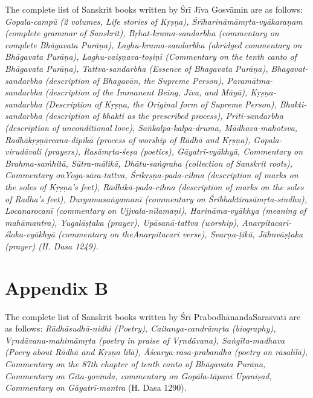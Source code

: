 The complete list of Sanskrit books written by Śrī Jīva Gosvāmin are as follows: {\sl  Gopala-campū {\rm (2 volumes, Life stories of Kṛṣṇa)}, Śrīharināmā\-mṛta-vyākaraṇam {\rm (complete grammar of Sanskrit)}, Bṛhat-krama-sanda\-rbha {\rm (commentary on complete {\sl Bhāgavata Purāṇa})}, Laghu-krama-\Break sandarbha {\rm (abridged commentary on {\sl Bhāgavata Purāṇa})}, Laghu-vai\-ṣṇa\-va-toṣiṇī {\rm (Commentary on the tenth canto of {\sl Bhāgavata Purāṇa})}, Tattva-sandarbha {\rm (Essence of {\sl Bhagavata Purāṇa})}, Bhagavat-sandarbha {\rm (description of Bhagavān, the Supreme Person)}, Paramātma-sandarbha {\rm (description of the Immanent Being, Jīva, and Māyā)}, Kṛṣṇa-sandarbha {\rm (Description of Kṛṣṇa, the Original form of Supreme Person)}, Bhakti-sandarbha {\rm (description of bhakti as the prescribed process)}, Prīti-sandarbha {\rm (description of unconditional love)}, Saṅkalpa-kalpa-druma, Mādhava-maho\-tsva, Radhākṛṣṇārcana-dipikā {\rm (process of worship of Rādhā and Kṛṣṇa)}, Gopala-virudāvali {\rm (prayers)}, Rasāmṛta-śeṣa {\rm (poetics)}, Gāyatrī-vyākhyā, Commentary on Brahma-saṁhitā, Sūtra-mālikā, Dhātu-saṅgraha {\rm (collection of Sanskrit roots)}, Commentary on\break Yoga-sāra-tattva, Śrīkṛṣṇa-pada-cihna {\rm (description of marks on the soles of Kṛṣṇa’s feet)}, Rādhikā-pada-cihna {\rm (description of marks on the soles of Radha’s feet)}, Durgamasaṅgamanī {\rm (commentary on {\sl Śrībhaktirasāmṛ\-ta-sindhu})}, Locanarocanī {\rm (commentary on {\sl Ujjvala-nīlamaṇi})}, Harināma-vyākhya  ({\rm meaning of} mahāmantra), Yugalāṣṭaka {\rm (prayer)}, Upāsanā-\Break tattva {\rm (worship)}, Anarpitacarī-śloka-vyākhyā {\rm (commentary on the\break Anarpitacari verse)}, Svarṇa-ṭīkā, Jāhnvāṣṭaka {\rm (prayer)} {\rm (H. Dasa 1249)}.} 

\section*{Appendix B}

{\rm The complete list of Sanskrit books written by Śrī Prabodhānanda\break Sarasvatī are as follows:} {\sl Rādhāsudhā-nidhi {\rm (Poetry)}, Caitanya-candrā\-mṛta {\rm (biography)}, Vṛndāvana-mahimāmṛta {\rm (poetry in praise of Vṛndāvana)}, Saṅgīta-madhava {\rm (Poery about Rādhā and Kṛṣṇa {\sl līlā})}, Āścarya-\Break rāsa-prabandha {\rm (poetry on {\sl rāsalīlā})}, {\rm Commentary on the 87th chapter of tenth canto of} Bhāgavata Purāṇa, {\rm Commentary on} Gīta-govinda, {\rm commentary on} Gopāla-tāpanī Upaniṣad, {\rm Commentary on} Gāyatrī-mantra} {\rm (H. Dasa 1290)}. 

